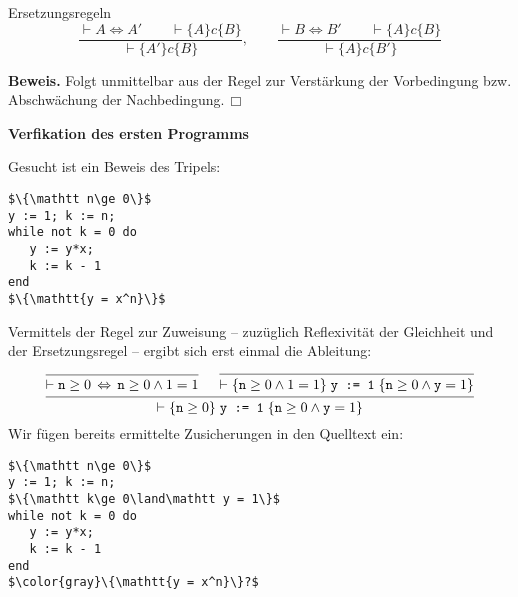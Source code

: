 \documentclass[8pt,fleqn,aspectratio=169]{beamer}
\newcommand{\strong}[1]{\textsf{\textbf{#1}}}
\renewcommand{\qedsymbol}{\ensuremath{\Box}}
\newcommand{\centerheadline}[1]{%
  \begin{center}\strong{#1}\end{center}}
\newcommand{\code}[1]{{\texttt{#1}}}
\begin{document}
\begin{frame}
\begin{block}{Ersetzungsregeln}
\[\dfrac{\vdash A\Leftrightarrow A'\qquad\vdash\{A\}c\{B\}}{
  \vdash\{A'\}c\{B\}},\qquad
\dfrac{\vdash B\Leftrightarrow B'\qquad\vdash\{A\}c\{B\}}{
  \vdash\{A\}c\{B'\}}\]
\end{block}\pause
\strong{Beweis.} Folgt unmittelbar aus der Regel zur Verstärkung der
Vorbedingung bzw. Abschwächung der Nachbedingung.\,\qedsymbol
\end{frame}

\begin{frame}
\centerheadline{Verfikation des ersten Programms}
\end{frame}

\begin{frame}[fragile]
Gesucht ist ein Beweis des Tripels:
\begin{lstlisting}[language=IMP, xleftmargin=\mathindent, mathescape]
$\{\mathtt n\ge 0\}$
y := 1; k := n;
while not k = 0 do
   y := y*x;
   k := k - 1
end
$\{\mathtt{y = x^n}\}$
\end{lstlisting}
\end{frame}

\begin{frame}[fragile]
Vermittels der Regel zur Zuweisung -- zuzüglich Reflexivität der
Gleichheit und der Ersetzungsregel -- ergibt sich erst einmal die Ableitung:
\[\begin{prooftree}
  \infer0{\vdash \mathtt n\ge 0\,\Leftrightarrow\,\mathtt n\ge 0\land 1 = 1}
  \infer0{\vdash\{\mathtt n\ge 0\land 1 = 1\}\;\code{y := 1}\;\{\mathtt n\ge 0\land\mathtt y = 1\}}
\infer2{\vdash\{\mathtt n\ge 0\}\;\code{y := 1}\;\{\mathtt n\ge 0\land\mathtt y = 1\}}
\end{prooftree}\]\pause
Wir fügen bereits ermittelte Zusicherungen in den Quelltext ein:
\begin{lstlisting}[language=IMP, xleftmargin=\mathindent, mathescape]
$\{\mathtt n\ge 0\}$
y := 1; k := n;
$\{\mathtt k\ge 0\land\mathtt y = 1\}$
while not k = 0 do
   y := y*x;
   k := k - 1
end
$\color{gray}\{\mathtt{y = x^n}\}?$
\end{lstlisting}
\end{frame}
\end{document}
